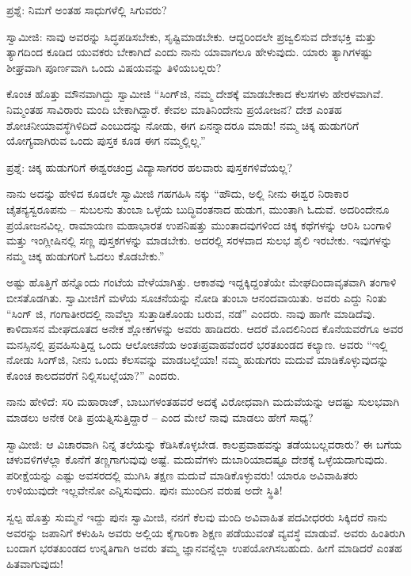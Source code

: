 ಪ್ರಶ್ನೆ: ನಿಮಗೆ ಅಂತಹ ಸಾಧುಗಳೆಲ್ಲಿ ಸಿಗುವರು?

ಸ್ವಾಮೀಜಿ: ನಾವು ಅವರನ್ನು ಸಿದ್ಧಪಡಿಸಬೇಕು, ಸೃಷ್ಟಿಮಾಡಬೇಕು. ಆದ್ದರಿಂದಲೇ ಪ್ರಜ್ವಲಿಸುವ ದೇಶಭಕ್ತಿ ಮತ್ತು ತ್ಯಾಗದಿಂದ ಕೂಡಿದ ಯುವಕರು ಬೇಕಾಗಿದೆ ಎಂದು ನಾನು ಯಾವಾಗಲೂ ಹೇಳುವುದು. ಯಾರು ತ್ಯಾಗಿಗಳಷ್ಟು ಶೀಘ್ರವಾಗಿ ಪೂರ್ಣವಾಗಿ ಒಂದು ವಿಷಯವನ್ನು ತಿಳಿಯಬಲ್ಲರು?

ಕೊಂಚ ಹೊತ್ತು ಮೌನವಾಗಿದ್ದು ಸ್ವಾಮೀಜಿ “ಸಿಂಗ್‌ಜಿ, ನಮ್ಮ ದೇಶಕ್ಕೆ ಮಾಡಬೇಕಾದ ಕೆಲಸಗಳು ಹೇರಳವಾಗಿವೆ. ನಿಮ್ಮಂತಹ ಸಾವಿರಾರು ಮಂದಿ ಬೇಕಾಗಿದ್ದಾರೆ. ಕೇವಲ ಮಾತಿನಿಂದೇನು ಪ್ರಯೋಜನ? ದೇಶ ಎಂತಹ ಶೋಚನೀಯಾವಸ್ಥೆಗಿಳಿದಿದೆ ಎಂಬುದನ್ನು ನೋಡು, ಈಗ ಏನನ್ನಾದರೂ ಮಾಡು! ನಮ್ಮ ಚಿಕ್ಕ ಹುಡುಗರಿಗೆ ಯೋಗ್ಯವಾಗಿರುವ ಒಂದು ಪುಸ್ತಕ ಕೂಡ ಈಗ ನಮ್ಮಲ್ಲಿಲ್ಲ.”

ಪ್ರಶ್ನೆ: ಚಿಕ್ಕ ಹುಡುಗರಿಗೆ ಈಶ್ವರಚಂದ್ರ ವಿದ್ಯಾಸಾಗರರ ಹಲವಾರು ಪುಸ್ತಕಗಳಿವೆಯಲ್ಲ?

ನಾನು ಅದನ್ನು ಹೇಳಿದ ಕೂಡಲೇ ಸ್ವಾಮೀಜಿ ಗಹಗಹಿಸಿ ನಕ್ಕು “ಹೌದು, ಅಲ್ಲಿ ನೀನು ಈಶ್ವರ ನಿರಾಕಾರ ಚೈತನ್ಯಸ್ವರೂಪನು – ಸುಬಲನು ತುಂಬಾ ಒಳ್ಳೆಯ ಬುದ್ಧಿವಂತನಾದ ಹುಡುಗ, ಮುಂತಾಗಿ ಓದುವೆ. ಅದರಿಂದೇನೂ ಪ್ರಯೋಜನವಿಲ್ಲ. ರಾಮಾಯಣ ಮಹಾಭಾರತ ಉಪನಿಷತ್ತು ಮುಂತಾದವುಗಳಿಂದ ಚಿಕ್ಕ ಕಥೆಗಳನ್ನು ಆರಿಸಿ ಬಂಗಾಳಿ ಮತ್ತು ಇಂಗ್ಲೀಷಿನಲ್ಲಿ ಸಣ್ಣ ಪುಸ್ತಕಗಳನ್ನು ಮಾಡಬೇಕು. ಅದರಲ್ಲಿ ಸರಳವಾದ ಸುಲಭ ಶೈಲಿ ಇರಬೇಕು. ಇವುಗಳನ್ನು ನಮ್ಮ ಚಿಕ್ಕ ಹುಡುಗರಿಗೆ ಓದಲು ಕೊಡಬೇಕು.”

ಅಷ್ಟು ಹೊತ್ತಿಗೆ ಹನ್ನೊಂದು ಗಂಟೆಯ ವೇಳೆಯಾಗಿತ್ತು. ಆಕಾಶವು ಇದ್ದಕ್ಕಿದ್ದಂತೆಯೇ ಮೇಘದಿಂದಾವೃತವಾಗಿ ತಂಗಾಳಿ ಬೀಸತೊಡಗಿತು. ಸ್ವಾಮೀಜಿಗೆ ಮಳೆಯ ಸೂಚನೆಯನ್ನು ನೋಡಿ ತುಂಬಾ ಆನಂದವಾಯಿತು. ಅವರು ಎದ್ದು ನಿಂತು “ಸಿಂಗ್ ಜಿ, ಗಂಗಾತೀರದಲ್ಲಿ ನಾವೆಲ್ಲಾ ಸುತ್ತಾಡಿಕೊಂಡು ಬರುವ, ನಡೆ” ಎಂದರು. ನಾವು ಹಾಗೇ ಮಾಡಿದೆವು. ಕಾಳಿದಾಸನ ಮೇಘದೂತದ ಅನೇಕ ಶ್ಲೋಕಗಳನ್ನು ಅವರು ಹಾಡಿದರು. ಆದರೆ ಮೊದಲಿನಿಂದ ಕೊನೆಯವರೆಗೂ ಅವರ ಮನಸ್ಸಿನಲ್ಲಿ ಪ್ರವಹಿಸುತ್ತಿದ್ದ ಒಂದು ಆಲೋಚನೆಯ ಅಂತಃಪ್ರವಾಹವೆಂದರೆ ಭರತಖಂಡದ ಕಲ್ಯಾಣ. ಅವರು “ಇಲ್ಲಿ ನೋಡು ಸಿಂಗ್‌ಜಿ, ನೀನು ಒಂದು ಕೆಲಸವನ್ನು ಮಾಡಬಲ್ಲೆಯಾ! ನಮ್ಮ ಹುಡುಗರು ಮದುವೆ ಮಾಡಿಕೊಳ್ಳುವುದನ್ನು ಕೊಂಚ ಕಾಲದವರೆಗೆ ನಿಲ್ಲಿಸಬಲ್ಲೆಯಾ?” ಎಂದರು.

ನಾನು ಹೇಳಿದೆ: ಸರಿ ಮಹಾರಾಜ್, ಬಾಬುಗಳಂತಹವರೆ ಅದಕ್ಕೆ ವಿರೋಧವಾಗಿ ಮದುವೆಯನ್ನು ಆದಷ್ಟು ಸುಲಭವಾಗಿ ಮಾಡಲು ಅನೇಕ ರೀತಿ ಪ್ರಯತ್ನಿಸುತ್ತಿದ್ದಾರೆ – ಎಂದ ಮೇಲೆ ನಾವು ಮಾಡಲು ಹೇಗೆ ಸಾಧ್ಯ?

ಸ್ವಾಮೀಜಿ: ಆ ವಿಚಾರವಾಗಿ ನಿನ್ನ ತಲೆಯನ್ನು ಕೆಡಿಸಿಕೊಳ್ಳಬೇಡ. ಕಾಲಪ್ರವಾಹವನ್ನು ತಡೆಯಬಲ್ಲವರಾರು? ಈ ಬಗೆಯ ಚಳುವಳಿಗಳೆಲ್ಲಾ ಕೊನೆಗೆ ತಣ್ಣಗಾಗುವುವು ಅಷ್ಟೆ. ಮದುವೆಗಳು ದುಬಾರಿಯಾದಷ್ಟೂ ದೇಶಕ್ಕೆ ಒಳ್ಳೆಯದಾಗುವುದು. ಪರೀಕ್ಷೆಯನ್ನು ಎಷ್ಟು ಅವಸರದಲ್ಲಿ ಮುಗಿಸಿ ತಕ್ಷಣ ಮದುವೆ ಮಾಡಿಕೊಳ್ಳುವರು! ಯಾರೂ ಅವಿವಾಹಿತರು ಉಳಿಯುವುದೇ ಇಲ್ಲವೇನೋ ಎನ್ನಿಸುವುದು. ಪುನಃ ಮುಂದಿನ ವರುಷ ಅದೇ ಸ್ಥಿತಿ!

ಸ್ವಲ್ಪ ಹೊತ್ತು ಸುಮ್ಮನೆ ಇದ್ದು ಪುನಃ ಸ್ವಾಮೀಜಿ, ನನಗೆ ಕೆಲವು ಮಂದಿ ಅವಿವಾಹಿತ ಪದವೀಧರರು ಸಿಕ್ಕಿದರೆ ನಾನು ಅವರನ್ನು ಜಪಾನಿಗೆ ಕಳುಹಿಸಿ ಅವರು ಅಲ್ಲಿಯ ಕೈಗಾರಿಕಾ ಶಿಕ್ಷಣ ಪಡೆಯುವಂತೆ ವ್ಯವಸ್ಥೆ ಮಾಡುವೆ. ಅವರು ಹಿಂತಿರುಗಿ ಬಂದಾಗ ಭರತಖಂಡದ ಉನ್ನತಿಗಾಗಿ ಅವರು ತಮ್ಮ ಜ್ಞಾನವನ್ನೆಲ್ಲಾ ಉಪಯೋಗಿಸಬಹುದು. ಹೀಗೆ ಮಾಡಿದರೆ ಎಂತಹ ಹಿತವಾಗುವುದು!

